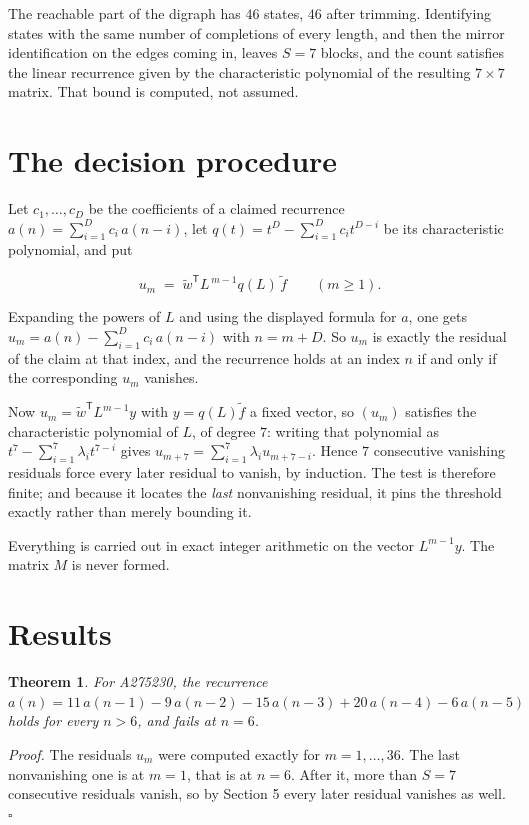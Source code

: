 \documentclass[11pt]{article}
\newtheorem{theorem}{Theorem}
\theoremstyle{definition}
\begin{document}
The reachable part of the digraph has $46$ states, $46$ after trimming. Identifying states with the same number of completions of every length, and then the mirror identification on the edges coming in, leaves $S = 7$ blocks, and the count satisfies the linear recurrence given by the characteristic polynomial of the resulting $7\times7$ matrix. That bound is computed, not assumed.

\section{The decision procedure}

Let $c_1,\dots,c_D$ be the coefficients of a claimed recurrence $a(n) = \sum_{i=1}^{D} c_i\,a(n-i)$, let $q(t) = t^{D} - \sum_{i=1}^{D} c_i t^{D-i}$ be its characteristic polynomial, and put

\[u_m \;=\; \tilde w^{\mathsf T} L^{\,m-1} q(L)\,\tilde f \qquad (m \ge 1).\]

Expanding the powers of $L$ and using the displayed formula for $a$, one gets $u_m = a(n) - \sum_{i=1}^{D} c_i\,a(n-i)$ with $n = m + D$. So $u_m$ is exactly the residual of the claim at that index, and the recurrence holds at an index $n$ if and only if the corresponding $u_m$ vanishes.

Now $u_m = \tilde w^{\mathsf T} L^{m-1} y$ with $y = q(L)\tilde f$ a fixed vector, so $(u_m)$ satisfies the characteristic polynomial of $L$, of degree $7$: writing that polynomial as $t^{7} - \sum_{i=1}^{7} \lambda_i t^{7-i}$ gives $u_{m+7} = \sum_{i=1}^{7} \lambda_i u_{m+7-i}$. Hence $7$ consecutive vanishing residuals force every later residual to vanish, by induction. The test is therefore finite; and because it locates the {\itshape last} nonvanishing residual, it pins the threshold exactly rather than merely bounding it.

Everything is carried out in exact integer arithmetic on the vector $L^{m-1}y$. The matrix $M$ is never formed.

\section{Results}

\begin{theorem} For A275230, the recurrence $a(n) = 11\,a(n-1) - 9\,a(n-2) - 15\,a(n-3) + 20\,a(n-4) - 6\,a(n-5)$ holds for every $n > 6$, and fails at $n = 6$.\end{theorem}

{\itshape Proof.} The residuals $u_m$ were computed exactly for $m = 1,\dots,36$. The last nonvanishing one is at $m = 1$, that is at $n = 6$. After it, more than $S = 7$ consecutive residuals vanish, so by Section 5 every later residual vanishes as well. $\square$
\end{document}
